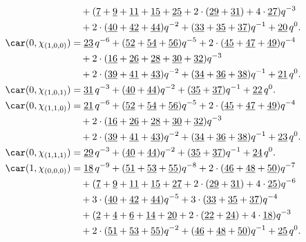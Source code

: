 \begin{align*}
	&\quad+(\underline{7}+\underline{9}+\underline{11}+\underline{15}+\underline{25}+2\cdot(\underline{29}+\underline{31})+4\cdot\underline{27})q^{-3}\\
	&\quad+2\cdot(\underline{40}+\underline{42}+\underline{44})q^{-2}+(\underline{33}+\underline{35}+\underline{37})q^{-1}+\underline{20}\,q^0.\\
	\car(0,\chi_{(1,0,0)})
	&=\underline{23}\,q^{-6}+(\underline{52}+\underline{54}+\underline{56})q^{-5}+2\cdot(\underline{45}+\underline{47}+\underline{49})q^{-4}\\
	&\quad+2\cdot(\underline{16}+\underline{26}+\underline{28}+\underline{30}+\underline{32})q^{-3}\\
	&\quad+2\cdot(\underline{39}+\underline{41}+\underline{43})q^{-2}+(\underline{34}+\underline{36}+\underline{38})q^{-1}+\underline{21}\,q^0.\\
	\car(0,\chi_{(1,0,1)})
	&=\underline{31}\,q^{-3}+(\underline{40}+\underline{44})q^{-2}+(\underline{35}+\underline{37})q^{-1}+\underline{22}\,q^0.\\
	\car(0,\chi_{(1,1,0)})
	&=\underline{21}\,q^{-6}+(\underline{52}+\underline{54}+\underline{56})q^{-5}+2\cdot(\underline{45}+\underline{47}+\underline{49})q^{-4}\\
	&\quad+2\cdot(\underline{16}+\underline{26}+\underline{28}+\underline{30}+\underline{32})q^{-3}\\
	&\quad+2\cdot(\underline{39}+\underline{41}+\underline{43})q^{-2}+(\underline{34}+\underline{36}+\underline{38})q^{-1}+\underline{23}\,q^0.\\
	\car(0,\chi_{(1,1,1)})
	&=\underline{29}\,q^{-3}+(\underline{40}+\underline{44})q^{-2}+(\underline{35}+\underline{37})q^{-1}+\underline{24}\,q^0.\\
	\car(1,\chi_{(0,0,0)})
	&=\underline{18}\,q^{-9}+(\underline{51}+\underline{53}+\underline{55})q^{-8}+2\cdot(\underline{46}+\underline{48}+\underline{50})q^{-7}\\
	&\quad+(\underline{7}+\underline{9}+\underline{11}+\underline{15}+\underline{27}+2\cdot(\underline{29}+\underline{31})+4\cdot\underline{25})q^{-6}\\
	&\quad+3\cdot(\underline{40}+\underline{42}+\underline{44})q^{-5}+3\cdot(\underline{33}+\underline{35}+\underline{37})q^{-4}\\
	&\quad+(\underline{2}+\underline{4}+\underline{6}+\underline{14}+\underline{20}+2\cdot(\underline{22}+\underline{24})+4\cdot\underline{18})q^{-3}\\
	&\quad+2\cdot(\underline{51}+\underline{53}+\underline{55})q^{-2}+(\underline{46}+\underline{48}+\underline{50})q^{-1}+\underline{25}\,q^0.\\

\end{align*}
